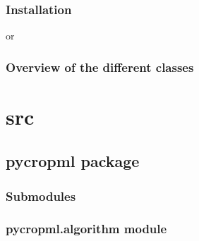 \documentclass[letterpaper,10pt,english]{sphinxmanual}
\begin{document}
\subsubsection{Installation}
\label{\detokenize{user/manual:installation}}
%
\begin{sphinxVerbatim}[commandchars=\\\{\}]
    
\end{sphinxVerbatim}

or

%
\begin{sphinxVerbatim}[commandchars=\\\{\}]
  
\end{sphinxVerbatim}


\subsubsection{Overview of the different classes}
\label{\detokenize{user/manual:overview-of-the-different-classes}}

\section{src}
\label{\detokenize{_dvlpt/modules:src}}\label{\detokenize{_dvlpt/modules::doc}}

\subsection{pycropml package}
\label{\detokenize{_dvlpt/pycropml::doc}}\label{\detokenize{_dvlpt/pycropml:pycropml-package}}

\subsubsection{Submodules}
\label{\detokenize{_dvlpt/pycropml:submodules}}

\subsubsection{pycropml.algorithm module}
\label{\detokenize{_dvlpt/pycropml:pycropml-algorithm-module}}\label{\detokenize{_dvlpt/pycropml:module-pycropml.algorithm}}
\end{document}
